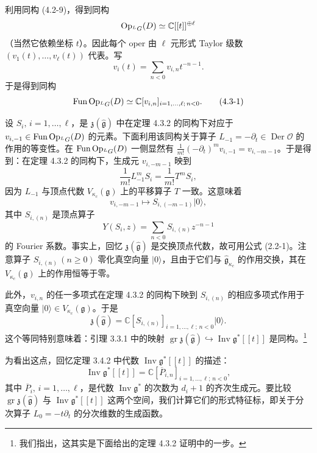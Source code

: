 利用同构 (4.2-9)，得到同构
\[
    \operatorname{Op}_{{}^LG}(D)\simeq\mathbb{C}[[t]]^{\oplus\ell}
\]
（当然它依赖坐标 $t$）。因此每个 oper 由 $\ell$ 元形式 Taylor 级数 $(v_1(t),\dots,v_\ell(t))$ 代表。写
\[
    v_i(t)=\sum_{n<0}v_{i,n}t^{-n-1}.
\]
于是得到同构
\begin{equation}
    \operatorname{Fun}\operatorname{Op}_{{}^LG}(D)\simeq\mathbb{C}[v_{i,n}]_{i=1,\dots,\ell;\,n<0}.
    \tag{4.3-1}
\end{equation}

设 $S_i,\,i=1,\dots,\ell$，是 $\mathfrak{z}(\hat{\mathfrak{g}})$ 中在定理 4.3.2 的同构下对应于 $v_{i,-1}\in\operatorname{Fun}\operatorname{Op}_{{}^LG}(D)$ 的元素。下面利用该同构关于算子 $L_{-1}=-\partial_t\in\operatorname{Der}\mathcal{O}$ 的作用的等变性。在 $\operatorname{Fun}\operatorname{Op}_{{}^LG}(D)$ 一侧显然有 $\frac{1}{m!}(-\partial_t)^mv_{i,-1}=v_{i,-m-1}$。于是得到：在定理 4.3.2 的同构下，生成元 $v_{i,-m-1}$ 映到
\[
    \frac{1}{m!}L_{-1}^mS_i=\frac{1}{m!}T^mS_i,
\]
因为 $L_{-1}$ 与顶点代数 $V_{\kappa_c}(\mathfrak{g})$ 上的平移算子 $T$ 一致。这意味着
\[
    v_{i,-m-1}\mapsto S_{i,(-m-1)}|0\rangle,
\]
其中 $S_{i,(n)}$ 是顶点算子
\[
    Y(S_i,z)=\sum_{n<0}S_{i,(n)}z^{-n-1}
\]
的 Fourier 系数。事实上，回忆 $\mathfrak{z}(\hat{\mathfrak{g}})$ 是交换顶点代数，故可用公式 (2.2-1)。注意算子 $S_{i,(n)}\,(n\ge0)$ 零化真空向量 $|0\rangle$，且由于它们与 $\hat{\mathfrak{g}}_{\kappa_c}$ 的作用交换，其在 $V_{\kappa_c}(\mathfrak{g})$ 上的作用恒等于零。

此外，$v_{i,n}$ 的任一多项式在定理 4.3.2 的同构下映到 $S_{i,(n)}$ 的相应多项式作用于真空向量 $|0\rangle\in V_{\kappa_c}(\mathfrak{g})$。于是
\begin{equation}
    \mathfrak{z}(\hat{\mathfrak{g}})=\mathbb{C}[S_{i,(n)}]_{i=1,\dots,\ell;\,n<0}|0\rangle.
    \tag{4.3-2}
\end{equation}
这个等同特别意味着：引理 3.3.1 中的映射 $\operatorname{gr}\mathfrak{z}(\hat{\mathfrak{g}})\hookrightarrow\operatorname{Inv}\mathfrak{g}^*[[t]]$ 是同构。\footnote{我们指出，这其实是下面给出的定理 4.3.2 证明中的一步。}

为看出这点，回忆定理 3.4.2 中代数 $\operatorname{Inv}\mathfrak{g}^*[[t]]$ 的描述：
\[
    \operatorname{Inv}\mathfrak{g}^*[[t]]=\mathbb{C}[\overline{P}_{i,n}]_{i=1,\dots,\ell;\,n<0},
\]
其中 $\overline{P}_i,\,i=1,\dots,\ell$，是代数 $\operatorname{Inv}\mathfrak{g}^*$ 的次数为 $d_i+1$ 的齐次生成元。要比较 $\operatorname{gr}\mathfrak{z}(\hat{\mathfrak{g}})$ 与 $\operatorname{Inv}\mathfrak{g}^*[[t]]$ 这两个空间，我们计算它们的形式特征标，即关于分次算子 $L_0=-t\partial_t$ 的分次维数的生成函数。

